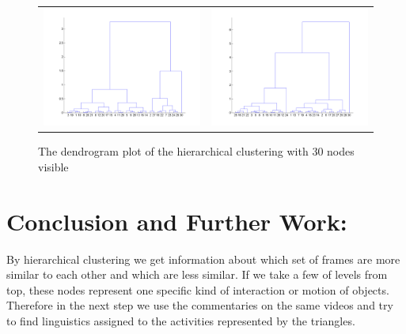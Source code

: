 \documentclass[11pt]{report}
\begin{document}
\begin{figure}[H]
\begin{tabular}{cc}
\includegraphics[scale=0.3]{dendoChase.png} &
\includegraphics[scale=0.3]{dendoCoax.png}
\end{tabular}
\caption{The dendrogram plot of the hierarchical clustering with 30 nodes visible}
\end{figure}
\section*{Conclusion and Further Work:}
By hierarchical clustering we get information about which set of frames are more similar to each other and which are less similar. If we take a few of levels from top, these nodes represent one specific kind of interaction or motion of objects. Therefore in the next step we use the commentaries on the same videos and try to find linguistics assigned to the activities represented by the triangles.


\end{document}
